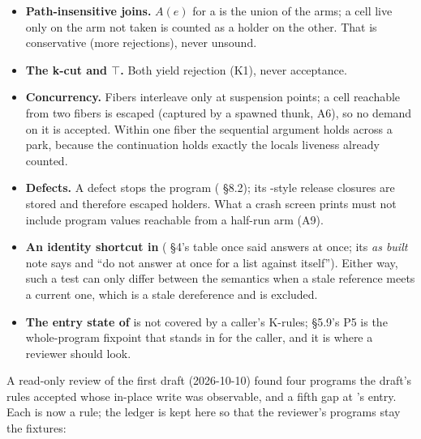 \begin{itemize}
\item \textbf{Path-insensitive joins.} $A(e)$ for a  is the union of the arms; a cell live only on the arm not taken is counted as a holder on the other. That is conservative (more rejections), never unsound.
\item \textbf{The k-cut and $\top$.} Both yield rejection (K1), never acceptance.
\item \textbf{Concurrency.} Fibers interleave only at suspension points; a cell reachable from two fibers is escaped (captured by a spawned thunk, A6), so no demand on it is accepted. Within one fiber the sequential argument holds across a park, because the continuation holds exactly the locals liveness already counted.
\item \textbf{Defects.} A defect stops the program ( §8.2); its -style release closures are stored and therefore escaped holders. What a crash screen prints must not include program values reachable from a half-run arm (A9).
\item \textbf{An identity shortcut in } ( §4's table once said  answers  at once; its \emph{as built} note says  and  “do not answer at once for a list against itself”). Either way, such a test can only differ between the semantics when a stale reference meets a current one, which is a stale dereference and is excluded.
\item \textbf{The entry state of } is not covered by a caller's K-rules; §5.9's P5 is the whole-program fixpoint that stands in for the caller, and it is where a reviewer should look.
\end{itemize}


A read-only review of the first draft (2026-10-10) found four programs the draft's rules accepted whose in-place write was observable, and a fifth gap at 's entry. Each is now a rule; the ledger is kept here so that the reviewer's programs stay the fixtures:

